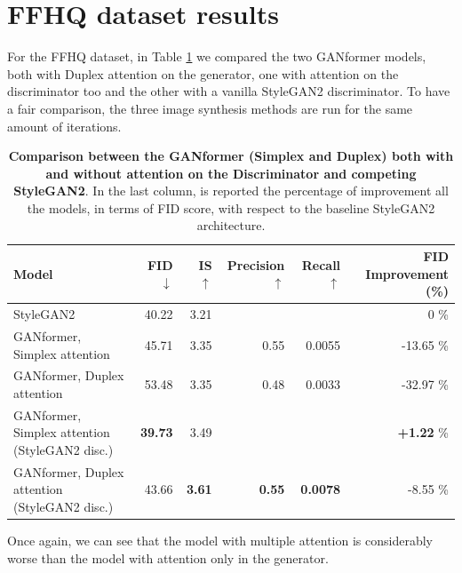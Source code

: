 \documentclass{article}
\begin{document}
\section{FFHQ dataset results}\label{sec:ffhq_results}
For the FFHQ dataset, in Table \ref{tab:results_ffhq} we compared the two GANformer models, both with Duplex attention on the generator, one with attention on the discriminator too and the other with a vanilla StyleGAN2 discriminator.
To have a fair comparison, the three image synthesis methods are run for the same amount of 
iterations.
\begin{table}[htb]
	\centering
	\caption{\textbf{Comparison between the GANformer (Simplex and Duplex) both with and without 
	attention on the Discriminator and competing StyleGAN2}. In the last column, is reported the percentage of improvement all the models, in terms of FID score, with respect to the baseline StyleGAN2 architecture.}
	\label{tab:results_ffhq}
	\vspace{3mm}
	\small
	\begin{tabular}{l|rrrrr}
		\toprule
		\textbf{Model}  & \textbf{FID $\downarrow$}  & \textbf{IS $\uparrow$} & 
		\textbf{Precision$\uparrow$}  & \textbf{Recall $\uparrow$} & \textbf{FID Improvement (\%)}\\ 
		\midrule
		StyleGAN2                    				&  {40.22} &  3.21 &  &  & 0 \%\\ 
		GANformer, Simplex attention & 45.71 & 3.35 &  0.55  &  0.0055 & -13.65 \%\\ 
		GANformer, Duplex attention  & {53.48} & 3.35 & 0.48& 0.0033 & -32.97 \%\\ 
		GANformer, Simplex attention (StyleGAN2 disc.)  &   \textbf{39.73}  & 3.49  &   &  &  \textbf{+1.22} \%\\ 
		GANformer, Duplex attention (StyleGAN2 disc.)  &  {43.66}  & \textbf{3.61} &   \textbf{0.55}   & \textbf{0.0078} & -{8.55} \%\\ 
		\bottomrule
	\end{tabular}
\end{table}

Once again, we can see that the model with multiple attention is considerably worse than the model with attention only in the generator. 
\end{document}
